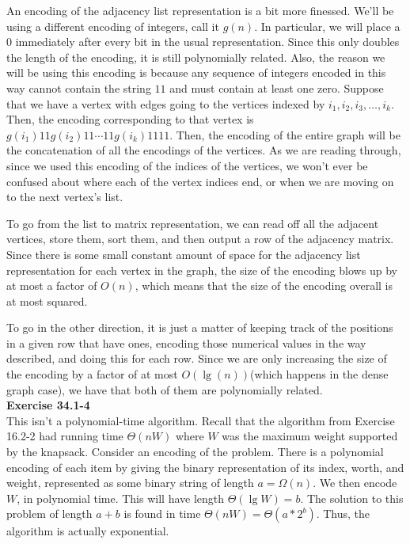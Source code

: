 \documentclass{article}
\begin{document}
An encoding of the adjacency list representation is a bit more finessed. We'll be using a different encoding of integers, call it $g(n)$. In particular, we will place a 0 immediately after every bit in the usual representation. Since this only doubles the length of the encoding, it is still polynomially related. Also, the reason we will be using this encoding is because any sequence of integers encoded in this way cannot contain the string $11$ and must contain at least one zero. Suppose that we have a vertex with edges going to the vertices indexed by $i_1,i_2,i_3,\ldots, i_k$. Then, the encoding corresponding to that vertex is $g(i_1)11g(i_2)11 \cdots 11g(i_k)1111$. Then, the encoding of the entire graph will be the concatenation of all the encodings of the vertices. As we are reading through, since we used this encoding of the indices of the vertices, we won't ever be confused about where each of the vertex indices end, or when we are moving on to the next vertex's list.

To go from the list to matrix representation, we can read off all the adjacent vertices, store them, sort them, and then output a row of the adjacency matrix. Since there is some small constant amount of space for the adjacency list representation for each vertex in the graph, the size of the encoding blows up by at most a factor of $O(n)$, which means that the size of the encoding overall is at most squared.

To go in the other direction, it is just a matter of keeping track of the positions in a given row that have ones, encoding those numerical values in the way described, and doing this for each row. Since we are only increasing the size of the encoding by a factor of at most $O(\lg(n))$(which happens in the dense graph case), we have that both of them are polynomially related.\\

\noindent\textbf{Exercise 34.1-4}\\

This isn't a polynomial-time algorithm.  Recall that the algorithm from Exercise 16.2-2 had running time $\Theta(nW)$ where $W$ was the maximum weight supported by the knapsack.  Consider an encoding of the problem.  There is a polynomial encoding of each item by giving the binary representation of its index, worth, and weight, represented as some binary string of length $a = \Omega(n)$. We then encode $W$, in polynomial time. This will have length $\Theta(\lg W) = b$.  The solution to this problem of length $a+b$ is found in time $\Theta(nW) = \Theta(a*2^b)$. Thus, the algorithm is actually exponential. \\
\end{document}
